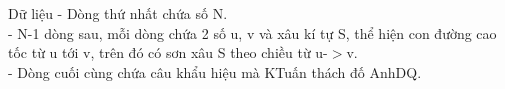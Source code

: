 Dữ liệu
- Dòng thứ nhất chứa số N.   
\\   - N-1 dòng sau, mỗi dòng chứa 2 số u, v và xâu kí tự S, thể hiện con đường cao tốc từ u tới v, trên đó có sơn xâu S theo chiều từ u-$>$v.   
\\   - Dòng cuối cùng chứa câu khẩu hiệu mà KTuấn thách đố AnhDQ.